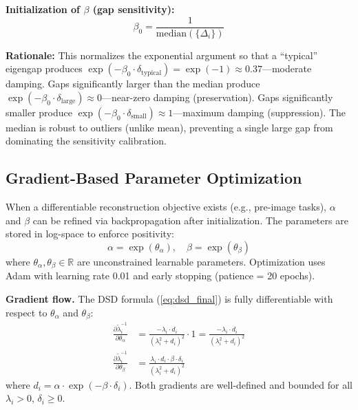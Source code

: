 \documentclass[journal]{IEEEtran}
\begin{document}
\textbf{Initialization of $\beta$ (gap sensitivity):}
\begin{equation}
\beta_0 = \frac{1}{\text{median}(\{\Delta_i\})}
\label{eq:beta_init}
\end{equation}

\textbf{Rationale:} This normalizes the exponential argument so that a ``typical'' eigengap produces $\exp(-\beta_0 \cdot \delta_{\text{typical}}) = \exp(-1) \approx 0.37$---moderate damping. Gaps significantly larger than the median produce $\exp(-\beta_0 \cdot \delta_{\text{large}}) \approx 0$---near-zero damping (preservation). Gaps significantly smaller produce $\exp(-\beta_0 \cdot \delta_{\text{small}}) \approx 1$---maximum damping (suppression). The median is robust to outliers (unlike mean), preventing a single large gap from dominating the sensitivity calibration.

\subsection{Gradient-Based Parameter Optimization}
\label{sec:gradient_optimization}

When a differentiable reconstruction objective exists (e.g., pre-image tasks), $\alpha$ and $\beta$ can be refined via backpropagation after initialization. The parameters are stored in log-space to enforce positivity:
\begin{equation}
\alpha = \exp(\theta_\alpha), \quad \beta = \exp(\theta_\beta)
\end{equation}
where $\theta_\alpha, \theta_\beta \in \mathbb{R}$ are unconstrained learnable parameters. Optimization uses Adam \cite{kingma2015adam} with learning rate 0.01 and early stopping (patience = 20 epochs).

\textbf{Gradient flow.} The DSD formula (\ref{eq:dsd_final}) is fully differentiable with respect to $\theta_\alpha$ and $\theta_\beta$:
\begin{align}
\frac{\partial \tilde{\lambda}_i^{-1}}{\partial \theta_\alpha} &= \frac{-\lambda_i \cdot d_i}{(\lambda_i^2 + d_i)^2} \cdot 1 = \frac{-\lambda_i \cdot d_i}{(\lambda_i^2 + d_i)^2} \label{eq:grad_alpha}\\
\frac{\partial \tilde{\lambda}_i^{-1}}{\partial \theta_\beta} &= \frac{\lambda_i \cdot d_i \cdot \beta \cdot \delta_i}{(\lambda_i^2 + d_i)^2} \label{eq:grad_beta}
\end{align}
where $d_i = \alpha \cdot \exp(-\beta \cdot \delta_i)$. Both gradients are well-defined and bounded for all $\lambda_i > 0$, $\delta_i \geq 0$.
\end{document}
